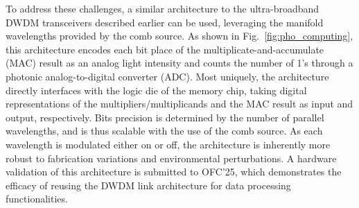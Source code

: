 To address these challenges, a similar architecture to the ultra-broadband DWDM transceivers described earlier can be used, leveraging the manifold wavelengths provided by the comb source. As shown in Fig.~\ref{fig:pho_computing}, this architecture encodes each bit place of the multiplicate-and-accumulate (MAC) result as an analog light intensity and counts the number of 1's through a photonic analog-to-digital converter (ADC). Most uniquely, the architecture directly interfaces with the logic die of the memory chip, taking digital representations of the multipliers/multiplicands and the MAC result as input and output, respectively. Bits precision is determined by the number of parallel wavelengths, and is thus scalable with the use of the comb source. As each wavelength is modulated either on or off, the architecture is inherently more robust to fabrication variations and environmental perturbations. A hardware validation of this architecture is submitted to OFC'25, which demonstrates the efficacy of reusing the DWDM link architecture for data processing functionalities.

\kant[4-6]